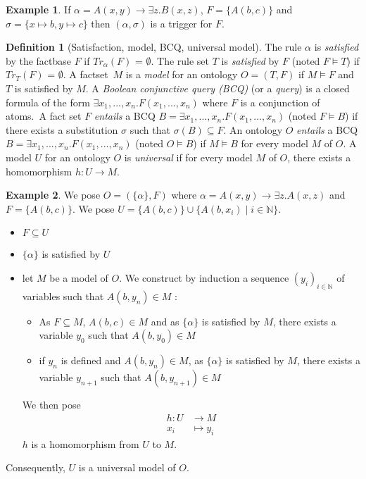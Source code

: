 \documentclass{article}
\theoremstyle{definition}
\newtheorem{definition}{Definition}[section]
\newtheorem{example}{Example}[section]
\theoremstyle{remark}
\def \N {\mathbb N}
\begin{document}
\begin{example}If $\alpha = A(x,y) \rightarrow \exists z.B(x,z)$, $F = \{A(b,c)\}$ and $\sigma = \{x \mapsto b, y \mapsto c \}$ then $(\alpha,\sigma)$ is a trigger for $F$.
\end{example}

\begin{definition}[Satisfaction, model, BCQ, universal model]
The rule $\alpha$ is \emph{satisfied} by the factbase $F$ if $Tr_{\alpha}(F)$ = $\emptyset$. The rule set $T$ is \emph{satisfied} by $F$ (noted $F \models T$) if $Tr_{T}(F)$ = $\emptyset$. A factset\ $M$ is a \emph{model} for an ontology $O = (T,F)$ if $M \models F$ and $T$ is satisfied by $M$. A \emph{Boolean conjunctive query (BCQ)} (or a \emph{query}) is a closed formula of the form $\exists x_1,...,x_n. F(x_1,...,x_n)$ where $F$ is a conjunction of atoms.\ A fact set $F$ \emph{entails} a BCQ $B = \exists x_1,...,x_n.F(x_1,...,x_n)$ (noted $F \vDash B$) if there exists a substitution $\sigma$ such that $\sigma(B) \subseteq F$. An ontology $O$ \emph{entails} a BCQ $B = \exists x_1,...,x_n.F(x_1,...,x_n)$ (noted $O \vDash B$) if $M \vDash B$ for every model $M$ of $O$. A model $U$ for an ontology $O$ is \emph{universal} if for
every model $M$ of $O$, there exists a homomorphism $h : U \to M$.
\end{definition}

\begin{example} We pose $O = (\{\alpha\},F)$ where $\alpha = A(x,y) \rightarrow \exists z.A(x,z)$ and $F = \{A(b,c)\}$. We pose $U = \{A(b,c)\}\cup \{A(b,x_i) \mid i \in \N\}$.
\begin{itemize}
\item $F \subseteq U$
\item $\{\alpha\}$ is satisfied by $U$
\item let $M$ be a model of $O$. We construct by induction a sequence $(y_i)_{i \in \N}$ of variables such that $A(b,y_n) \in M$ : 
\begin{itemize}
\item As $F \subseteq M$, $A(b,c) \in M$ and as $\{\alpha\}$ is satisfied by $M$, there exists a variable $y_0$ such that $A(b,y_0) \in M$
\item if $y_n$ is defined and $A(b,y_n) \in M$, as $\{\alpha\}$ is satisfied by $M$, there exists a variable $y_{n+1}$ such that $A(b,y_{n+1}) \in M$
\end{itemize}
We then pose 
\begin{align*}
h:U &\to M\\
x_i &\mapsto y_i
\end{align*}
$h$ is a homomorphism from $U$ to $M$.
\end{itemize}
Consequently, $U$ is a universal model of $O$.
\end{example}
\end{document}
